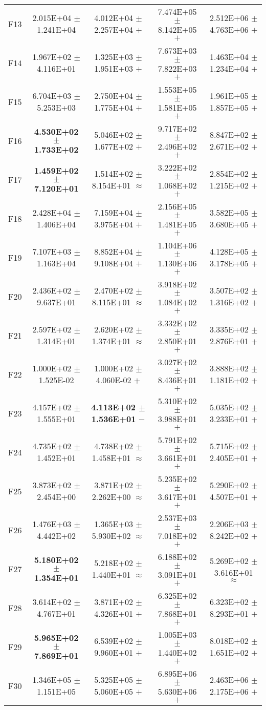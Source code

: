 \documentclass[paper]{ieice}
\begin{document}
\begin{table*}[htbp]
\begin{tabular}{c|c|c|c|c}
		F13	&	2.015E+04	$\pm$	1.241E+04		&	4.012E+04	$\pm$	2.257E+04	$+$	&	7.474E+05	$\pm$	8.142E+05	$+$	&	2.512E+06	$\pm$	4.763E+06	$+$	\\
		F14	&	1.967E+02	$\pm$	4.116E+01		&	1.325E+03	$\pm$	1.951E+03	$+$	&	7.673E+03	$\pm$	7.822E+03	$+$	&	1.463E+04	$\pm$	1.234E+04	$+$	\\
		F15	&	6.704E+03	$\pm$	5.253E+03		&	2.750E+04	$\pm$	1.775E+04	$+$	&	1.553E+05	$\pm$	1.581E+05	$+$	&	1.961E+05	$\pm$	1.857E+05	$+$	\\
		F16	&	\textbf{4.530E+02	$\pm$	1.733E+02}		&	5.046E+02	$\pm$	1.677E+02	$+$	&	9.717E+02	$\pm$	2.496E+02	$+$	&	8.847E+02	$\pm$	2.671E+02	$+$	\\
		F17	&	\textbf{1.459E+02	$\pm$	7.120E+01}		&	1.514E+02	$\pm$	8.154E+01	$\approx$	&	3.222E+02	$\pm$	1.068E+02	$+$	&	2.854E+02	$\pm$	1.215E+02	$+$	\\
		F18	&	2.428E+04	$\pm$	1.406E+04		&	7.159E+04	$\pm$	3.975E+04	$+$	&	2.156E+05	$\pm$	1.481E+05	$+$	&	3.582E+05	$\pm$	3.680E+05	$+$	\\
		F19	&	7.107E+03	$\pm$	1.163E+04		&	8.852E+04	$\pm$	9.108E+04	$+$	&	1.104E+06	$\pm$	1.130E+06	$+$	&	4.128E+05	$\pm$	3.178E+05	$+$	\\
		F20	&	2.436E+02	$\pm$	9.637E+01		&	2.470E+02	$\pm$	8.115E+01	$\approx$	&	3.918E+02	$\pm$	1.084E+02	$+$	&	3.507E+02	$\pm$	1.316E+02	$+$	\\
		F21	&	2.597E+02	$\pm$	1.314E+01		&	2.620E+02	$\pm$	1.374E+01	$\approx$	&	3.332E+02	$\pm$	2.850E+01	$+$	&	3.335E+02	$\pm$	2.876E+01	$+$	\\
		F22	&	1.000E+02	$\pm$	1.525E-02		&	1.000E+02	$\pm$	4.060E-02	$+$	&	3.027E+02	$\pm$	8.436E+01	$+$	&	3.888E+02	$\pm$	1.181E+02	$+$	\\
		F23	&	4.157E+02	$\pm$	1.555E+01		&	\textbf{4.113E+02	$\pm$	1.536E+01}	$-$	&	5.310E+02	$\pm$	3.988E+01	$+$	&	5.035E+02	$\pm$	3.233E+01	$+$	\\
		F24	&	4.735E+02	$\pm$	1.452E+01		&	4.738E+02	$\pm$	1.458E+01	$\approx$	&	5.791E+02	$\pm$	3.661E+01	$+$	&	5.715E+02	$\pm$	2.405E+01	$+$	\\
		F25	&	3.873E+02	$\pm$	2.454E+00		&	3.871E+02	$\pm$	2.262E+00	$\approx$	&	5.235E+02	$\pm$	3.617E+01	$+$	&	5.290E+02	$\pm$	4.507E+01	$+$	\\
		F26	&	1.476E+03	$\pm$	4.442E+02		&	1.365E+03	$\pm$	5.930E+02	$\approx$	&	2.537E+03	$\pm$	7.018E+02	$+$	&	2.206E+03	$\pm$	8.242E+02	$+$	\\
		F27	&	\textbf{5.180E+02	$\pm$	1.354E+01}		&	5.218E+02	$\pm$	1.440E+01	$\approx$	&	6.188E+02	$\pm$	3.091E+01	$+$	&	5.269E+02	$\pm$	3.616E+01	$\approx$	\\
		F28	&	3.614E+02	$\pm$	4.767E+01		&	3.871E+02	$\pm$	4.326E+01	$+$	&	6.325E+02	$\pm$	7.868E+01	$+$	&	6.323E+02	$\pm$	8.293E+01	$+$	\\
		F29	&	\textbf{5.965E+02	$\pm$	7.869E+01}		&	6.539E+02	$\pm$	9.960E+01	$+$	&	1.005E+03	$\pm$	1.440E+02	$+$	&	8.018E+02	$\pm$	1.651E+02	$+$	\\
		F30	&	1.346E+05	$\pm$	1.151E+05		&	5.325E+05	$\pm$	5.060E+05	$+$	&	6.895E+06	$\pm$	5.630E+06	$+$	&	2.463E+06	$\pm$	2.175E+06	$+$	\\ \hline
		

\end{tabular}
\end{table*}
\end{document}

